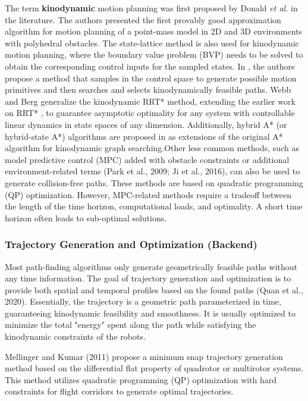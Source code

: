 The term \textbf{kinodynamic} motion planning was first proposed by Donald \textit{et al.} \cite{donald-1993} in the literature. The authors presented the first provably good approximation algorithm for motion planning of a point-mass model in 2D and 3D environments with polyhedral obstacles. The state-lattice method \cite{pivtoraiko-2011} is also used for kinodynamic motion planning, where the boundary value problem (BVP) needs to be solved to obtain the corresponding control inputs for the sampled states. In \cite{zhou-2019}, the authors propose a method that samples in the control space to generate possible motion primitives and then searches and selects kinodynamically feasible paths. Webb and Berg \cite{webb-2013} generalize the kinodynamic RRT* method, extending the earlier work on RRT* \cite{karaman-2011}, to guarantee asymptotic optimality for any system with controllable linear dynamics in state spaces of any dimension. Additionally, hybrid A* (or hybrid-state A*) algorithms are proposed in \cite{dolgov-2008,dolgov-2009,dolgov-2010} as extensions of the original A* algorithm for kinodynamic graph searching.Other less common methods, such as model predictive control (MPC) added with obstacle constraints or additional environment-related terms (Park et al., 2009; Ji et al., 2016), can also be used to generate collision-free paths. These methods are based on quadratic programming (QP) optimization. However, MPC-related methods require a tradeoff between the length of the time horizon, computational loads, and optimality. A short time horizon often leads to sub-optimal solutions.

\subsubsection{Trajectory Generation and Optimization (Backend)}
Most path-finding algorithms only generate geometrically feasible paths without any time information. The goal of trajectory generation and optimization is to provide both spatial and temporal profiles based on the found paths (Quan et al., 2020). Essentially, the trajectory is a geometric path parameterized in time, guaranteeing kinodynamic feasibility and smoothness. It is usually optimized to minimize the total "energy" spent along the path while satisfying the kinodynamic constraints of the robots.

Mellinger and Kumar (2011) propose a minimum snap trajectory generation method based on the differential flat property of quadrotor or multirotor systems. This method utilizes quadratic programming (QP) optimization with hard constraints for flight corridors to generate optimal trajectories.

